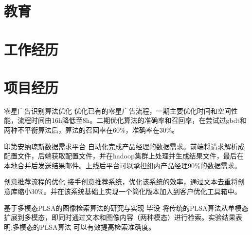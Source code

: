 \documentclass[11pt,a4paper]{moderncv}
\title{}               %
\begin{document}
\maketitle

\section{教育}

\section{工作经历}


\section{项目经历}
\renewcommand{\baselinestretch}{1.2}
{零星广告识别算法优化}
{}
{}{}
{优化已有的零星广告流程，一期主要优化时间和空间性能，流程时间由16h降低至8h。二期优化算法的准确率和召回率，在尝试过gbdt和两种不平衡算法后，算法的召回率在60\%，准确率在30\%。}

\vspace*{0.2\baselineskip}
{印第安纳琼斯数据需求平台}
{}
{}{}
{自动化完成产品经理的数据需求。前端将请求解析成配置文件，后端获取配置文件，并在hadoop集群上处理并生成结果文件，最后在本地合并后发送结果邮件。上线后平台可以承担组内产品经理90\%的数据需求。}

\vspace*{0.2\baselineskip}
{创意推荐流程的优化}
{}
{}{}
{接手创意推荐系统，优化该系统的效率，通过文本去重将创意库缩小30\%。并在该系统基础上实现一个简化版本加入到客户优化工具箱中。}

\vspace*{0.2\baselineskip}
{基于多模态PLSA的图像检索算法的研究与实现}
{}
{毕设}{}
{将传统的PLSA算法从单模态扩展到多模态，即同时通过文本和图像内容（两种模态）进行检索。实验结果表明,多模态的PLSA算法 可以有效提高检索准确度。}
\end{document}
